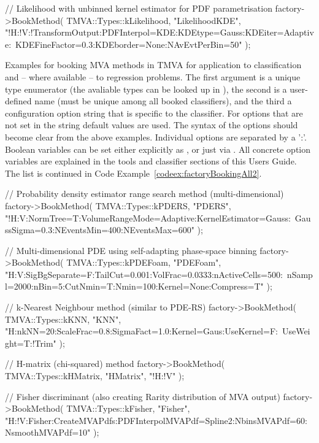 \begin{appendix}
\begin{codeexample}
\begin{tmvacode}
// Likelihood with unbinned kernel estimator for PDF parametrisation
factory->BookMethod( TMVA::Types::kLikelihood, "LikelihoodKDE", 
    "!H:!V:!TransformOutput:PDFInterpol=KDE:KDEtype=Gauss:KDEiter=Adaptive:\
     KDEFineFactor=0.3:KDEborder=None:NAvEvtPerBin=50" ); 
\end{tmvacode}
\caption[.]{\codeexampleCaptionSize Examples for booking MVA methods in TMVA for
            application to classification and -- where available -- to regression problems. 
            The first argument is 
            a unique type enumerator (the avaliable types can be looked up in ),
            the second is a user-defined name (must be unique among all booked classifiers),
            and the third a configuration option string that is specific to the 
            classifier. For options that are not set in the 
            string default values are used. The syntax of the options should become
            clear from the above examples. Individual options are separated by a 
            ':'. Boolean variables can be set either explicitly as 
            \code{MyBoolVar=True/False}, or just via .
            All concrete option variables are explained in the tools and classifier sections
            of this Users Guide. The list is continued in Code Example~\ref{codeex:factoryBookingAll2}.}
\label{codeex:factoryBookingAll1}
\end{codeexample}
\begin{codeexample}
\begin{tmvacode}
// Probability density estimator range search method (multi-dimensional)
factory->BookMethod( TMVA::Types::kPDERS, "PDERS", 
    "!H:V:NormTree=T:VolumeRangeMode=Adaptive:KernelEstimator=Gauss:\
     GaussSigma=0.3:NEventsMin=400:NEventsMax=600" );

// Multi-dimensional PDE using self-adapting phase-space binning
factory->BookMethod( TMVA::Types::kPDEFoam, "PDEFoam", 
    "H:V:SigBgSeparate=F:TailCut=0.001:VolFrac=0.0333:nActiveCells=500:\
     nSampl=2000:nBin=5:CutNmin=T:Nmin=100:Kernel=None:Compress=T" );

// k-Nearest Neighbour method (similar to PDE-RS)
factory->BookMethod( TMVA::Types::kKNN, "KNN", 
    "H:nkNN=20:ScaleFrac=0.8:SigmaFact=1.0:Kernel=Gaus:UseKernel=F:\
     UseWeight=T:!Trim" );

// H-matrix (chi-squared) method
factory->BookMethod( TMVA::Types::kHMatrix, "HMatrix", "!H:!V" ); 

// Fisher discriminant (also creating Rarity distribution of MVA output)
factory->BookMethod( TMVA::Types::kFisher, "Fisher", 
    "H:!V:Fisher:CreateMVAPdfs:PDFInterpolMVAPdf=Spline2:NbinsMVAPdf=60:\
     NsmoothMVAPdf=10" );


\end{tmvacode}
\end{codeexample}
\end{appendix}
